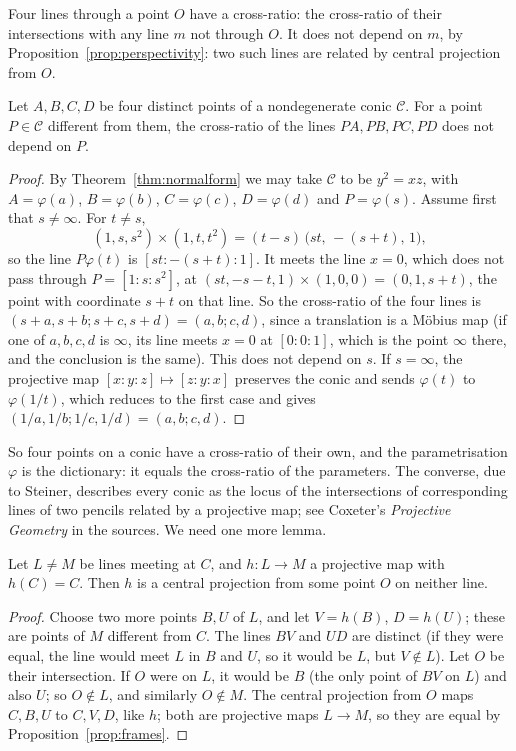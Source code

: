 Four lines through a point $O$ have a cross-ratio: the cross-ratio of their intersections with any line $m$ not through $O$. It does not depend on
$m$, by Proposition~\ref{prop:perspectivity}: two such lines are related by central projection from $O$.

\begin{theorem}\label{thm:chaslesconic}
Let $A,B,C,D$ be four distinct points of a nondegenerate conic $\mathcal C$. For a point $P\in\mathcal C$ different from them, the cross-ratio of the
lines $PA,PB,PC,PD$ does not depend on $P$.
\end{theorem}

\begin{proof}
By Theorem~\ref{thm:normalform} we may take $\mathcal C$ to be $y^2=xz$, with $A=\varphi(a)$, $B=\varphi(b)$, $C=\varphi(c)$, $D=\varphi(d)$ and
$P=\varphi(s)$. Assume first that $s\ne\infty$. For $t\ne s$,
\[
(1,s,s^2)\times(1,t,t^2)=(t-s)\,\bigl(st,\,-(s+t),\,1\bigr),
\]
so the line $P\varphi(t)$ is $[st:-(s+t):1]$. It meets the line $x=0$, which does not pass through $P=[1:s:s^2]$, at
$(st,-s-t,1)\times(1,0,0)=(0,1,s+t)$, the point with coordinate $s+t$ on that line. So the cross-ratio of the four lines is
$(s+a,s+b;s+c,s+d)=(a,b;c,d)$, since a translation is a M\"obius map (if one of $a,b,c,d$ is $\infty$, its line meets $x=0$ at $[0:0:1]$, which is
the point $\infty$ there, and the conclusion is the same). This does not depend on $s$. If $s=\infty$, the projective map $[x:y:z]\mapsto[z:y:x]$
preserves the conic and sends $\varphi(t)$ to $\varphi(1/t)$, which reduces to the first case and gives $(1/a,1/b;1/c,1/d)=(a,b;c,d)$.
\end{proof}

So four points on a conic have a cross-ratio of their own, and the parametrisation $\varphi$ is the dictionary: it equals the cross-ratio of the
parameters. The converse, due to Steiner, describes every conic as the locus of the intersections of corresponding lines of two pencils related
by a projective map; see Coxeter's \emph{Projective Geometry} in the sources. We need one more lemma.

\begin{lemma}\label{lem:perspectivity}
Let $L\ne M$ be lines meeting at $C$, and $h:L\to M$ a projective map with $h(C)=C$. Then $h$ is a central projection from some point $O$ on neither line.
\end{lemma}

\begin{proof}
Choose two more points $B,U$ of $L$, and let $V=h(B)$, $D=h(U)$; these are points of $M$ different from $C$. The lines $BV$ and $UD$ are distinct
(if they were equal, the line would meet $L$ in $B$ and $U$, so it would be $L$, but $V\notin L$). Let $O$ be their intersection. If $O$ were on $L$, it
would be $B$ (the only point of $BV$ on $L$) and also $U$; so $O\notin L$, and similarly $O\notin M$. The central projection from $O$ maps $C,B,U$ to
$C,V,D$, like $h$; both are projective maps $L\to M$, so they are equal by Proposition~\ref{prop:frames}.
\end{proof}

